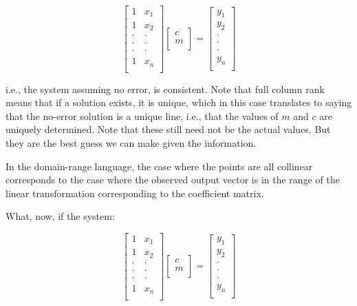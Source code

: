 \documentclass[10pt]{amsart}
\begin{document}
$$\left[\begin{matrix} 1 & x_1 \\ 1 & x_2 \\ \cdot & \cdot \\ \cdot & \cdot \\ \cdot & \cdot \\ 1 & x_n \\\end{matrix}\right]\left[\begin{matrix} c \\ m \\\end{matrix}\right] = \left[\begin{matrix} y_1 \\ y_2 \\ \cdot \\ \cdot \\ \cdot \\ y_n \\\end{matrix}\right]$$

i.e., the system assuming no error, is consistent. Note that full
column rank means that if a solution exists, it is unique, which in
this case translates to saying that the no-error solution is a unique
line, i.e., that the values of $m$ and $c$ are uniquely
determined. Note that these still need not be the actual values. But
they are the best guess we can make given the information.

In the domain-range language, the case where the points are all
collinear corresponds to the case where the observed output vector is
in the range of the linear transformation corresponding to the
coefficient matrix.

What, now, if the system:

$$\left[\begin{matrix} 1 & x_1 \\ 1 & x_2 \\ \cdot & \cdot \\ \cdot & \cdot \\ \cdot & \cdot \\ 1 & x_n \\\end{matrix}\right]\left[\begin{matrix} c \\ m \\\end{matrix}\right] = \left[\begin{matrix} y_1 \\ y_2 \\ \cdot \\ \cdot \\ \cdot \\ y_n \\\end{matrix}\right]$$
\end{document}
